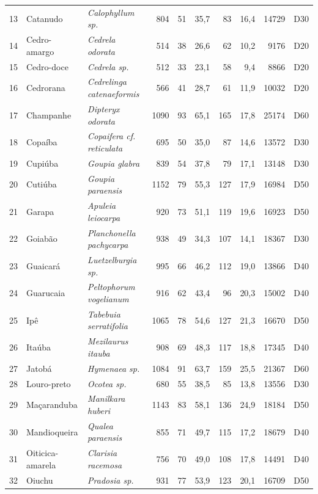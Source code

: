 \begin{table}[!ht]
\begin{threeparttable}
\begin{tabular*}{\textwidth}{@{\extracolsep{\fill}}rllrrrrrrr@{\extracolsep{\fill}}}
13 & Catanudo & \textit{Calophyllum sp.} & 804 & 51 & 35,7 & 83 & 16,4 & 14729 & D30 \\
14 & Cedro-amargo & \textit{Cedrela odorata} & 514 & 38 & 26,6 & 62 & 10,2 & 9176 & D20 \\
15 & Cedro-doce & \textit{Cedrela sp.} & 512 & 33 & 23,1 & 58 & 9,4 & 8866 & D20 \\
16 & Cedrorana & \textit{Cedrelinga catenaeformis} & 566 & 41 & 28,7 & 61 & 11,9 & 10032 & D20 \\
17 & Champanhe & \textit{Dipteryx odorata} & 1090 & 93 & 65,1 & 165 & 17,8 & 25174 & D60 \\
18 & Copaíba & \textit{Copaifera cf. reticulata} & 695 & 50 & 35,0 & 87 & 14,6 & 13572 & D30 \\
19 & Cupiúba & \textit{Goupia glabra} & 839 & 54 & 37,8 & 79 & 17,1 & 13148 & D30 \\
20 & Cutiúba & \textit{Goupia paraensis} & 1152 & 79 & 55,3 & 127 & 17,9 & 16984 & D50 \\
21 & Garapa & \textit{Apuleia leiocarpa} & 920 & 73 & 51,1 & 119 & 19,6 & 16923 & D50 \\
22 & Goiabão & \textit{Planchonella pachycarpa} & 938 & 49 & 34,3 & 107 & 14,1 & 18367 & D30 \\
23 & Guaicará & \textit{Luetzelburgia sp.} & 995 & 66 & 46,2 & 112 & 19,0 & 13866 & D40 \\
24 & Guarucaia & \textit{Peltophorum vogelianum} & 916 & 62 & 43,4 & 96 & 20,3 & 15002 & D40 \\
25 & Ipê & \textit{Tabebuia serratifolia} & 1065 & 78 & 54,6 & 127 & 21,3 & 16670 & D50 \\
26 & Itaúba & \textit{Mezilaurus itauba} & 908 & 69 & 48,3 & 117 & 18,8 & 17345 & D40 \\
27 & Jatobá & \textit{Hymenaea sp.} & 1084 & 91 & 63,7 & 159 & 25,5 & 21367 & D60 \\
28 & Louro-preto & \textit{Ocotea sp.} & 680 & 55 & 38,5 & 85 & 13,8 & 13556 & D30 \\
29 & Maçaranduba & \textit{Manilkara huberi} & 1143 & 83 & 58,1 & 136 & 24,9 & 18184 & D50 \\
30 & Mandioqueira & \textit{Qualea paraensis} & 855 & 71 & 49,7 & 115 & 17,2 & 18679 & D40 \\
31 & Oiticica-amarela & \textit{Clarisia racemosa} & 756 & 70 & 49,0 & 108 & 17,8 & 14491 & D40 \\
32 & Oiuchu & \textit{Pradosia sp.} & 931 & 77 & 53,9 & 123 & 20,1 & 16709 & D50 \\

\end{tabular*}
\end{threeparttable}
\end{table}
